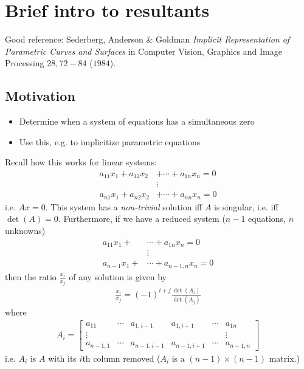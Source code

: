\section{Brief intro to resultants}
Good reference: Sederberg, Anderson \& Goldman \textit{Implicit
  Representation of Parametric Curves and Surfaces} in Computer
Vision, Graphics and Image Processing $28, 72-84$ ($1984$).

\subsection{Motivation}
\begin{itemize}
\item Determine when a system of equations has a simultaneous zero
\item Use this, e.g. to implicitize parametric equations
\end{itemize}

Recall how this works for linear systems:
\begin{align*}
  a_{11}x_1 + a_{12}x_2 &+ \cdots + a_{1n}x_n = 0 \\
                        &\vdots \\
  a_{n1}x_1 + a_{n2}x_2 &+ \cdots + a_{nn}x_n = 0
\end{align*}
i.e. $Ax = 0$. This system has a \textit{non-trivial} solution iff $A$
is singular, i.e. iff $\det(A) = 0$. Furthermore, if we have a reduced
system ($n-1$ equations, $n$ unknowns)
\begin{align*}
  a_{11}x_1 + &\cdots + a_{1n}x_n = 0 \\
              &\vdots \\
  a_{n-1}x_1 + &\cdots + a_{n-1, n}x_n = 0
\end{align*}
then the ratio $\frac{x_i}{x_j}$ of any solution is given by
\begin{align*}
  \frac{x_i}{x_j} = (-1)^{i+j} \frac{\det(A_i)}{\det(A_j)}
\end{align*}
where
\begin{align*}
  A_i =
  \begin{bmatrix}
    a_{11} &\cdots &a_{1, i-1} &a_{1, i+1} &\cdots &a_{1n} \\
    \vdots&&&&&\vdots \\
    a_{n-1, 1} &\cdots &a_{n-1, i-1} &a_{n-1, i+1} &\cdots &a_{n-1, n}
  \end{bmatrix}
\end{align*}
i.e. $A_i$ is $A$ with its $i$th column removed ($A_i$ is a
$(n-1)\times (n-1)$ matrix.)

